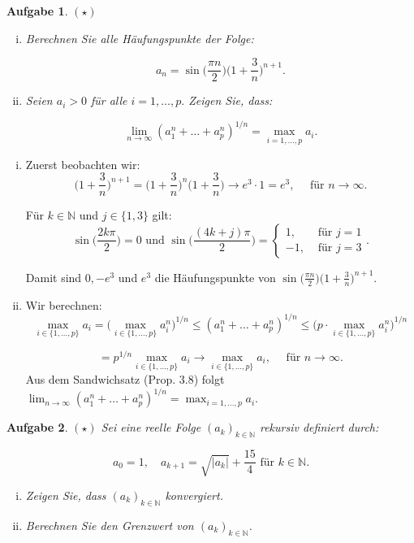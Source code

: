 \documentclass[a4paper, 20]{exam}
\newtheorem{ex}{Aufgabe}
\newcommand\NN{\mathbb{N}}
\begin{document}
\begin{ex}{$(\star)$}
\begin{enumerate}[i.)]

\item
Berechnen Sie alle H\"aufungspunkte der Folge:

$$ a_n = \sin \Big(\frac{\pi n}{2} \Big) \bigg( 1 + \frac{3}{n} \bigg)^{n+1} .$$

\item
Seien $a_i >0$ f\"ur alle $i= 1, \dots , p.$ Zeigen Sie, dass:

$$ \lim_{n \rightarrow \infty} (a_1^n + \dots + a_p^n)^{1/n} = \max_{i= 1, \dots , p} a_i .$$
\end{enumerate}
\end{ex}
\begin{solution}
\begin{enumerate}[i.)]

\item
Zuerst beobachten wir:
$$ \bigg( 1 +\frac{3}{n} \bigg)^{n+1} = \bigg( 1 +\frac{3}{n} \bigg)^{n} \bigg( 1 +\frac{3}{n} \bigg) \longrightarrow e^3 \cdot 1 = e^3, \quad \text{ f\"ur } n \longrightarrow \infty.$$

F\"ur $k\in \NN$ und $j\in \{ 1, 3 \}$ gilt:
$$ \sin\bigg(\frac{2k \pi}{2}\bigg) = 0 \text{ und } \sin\bigg(\frac{(4k + j)\pi}{2}\bigg)= \begin{cases} 1, &\text{ für } j=1 \\ -1, & \text{ für } j=3 \end{cases}.$$

Damit sind $0, -e^3$ und $e^3$ die H\"aufungspunkte von $\sin \Big(\frac{\pi n}{2} \Big) \bigg( 1 + \frac{3}{n} \bigg)^{n+1}$.
\item
Wir berechnen:
$$ \max_{i\in \{1,\dots, p \}} a_i = \bigg(\max_{i\in \{1,\dots, p \}} a_i^n \bigg)^{1/n}
\leq (a_1^n + \dots + a_p^n)^{1/n} 
\leq \bigg(p \cdot \max_{i\in \{1,\dots, p \}} a_i^n \bigg)^{1/n}$$

$$= p^{1/n} \max_{i\in \{1,\dots, p \}} a_i \longrightarrow \max_{i\in \{1,\dots, p \}} a_i, \quad \text{ f\"ur } n \longrightarrow \infty.$$
Aus dem Sandwichsatz (Prop. 3.8) folgt $\lim_{n \rightarrow \infty} (a_1^n + \dots + a_p^n)^{1/n} = \max_{i= 1, \dots , p} a_i .$
\end{enumerate}
\end{solution}


\begin{ex}{$(\star)$}
Sei eine reelle Folge $(a_k)_{k\in \NN}$ rekursiv definiert durch:

$$ a_0=1,  \quad a_{k+1} = \sqrt{\vert a_k \vert} + \frac{15}{4} \text{ f\"ur } k\in \NN.$$

\begin{enumerate}[i.)]
\item
Zeigen Sie, dass $(a_k)_{k\in \NN}$ konvergiert.

\item
Berechnen Sie den Grenzwert von $(a_k)_{k\in \NN}$.
\end{enumerate}
\end{ex}
\end{document}
